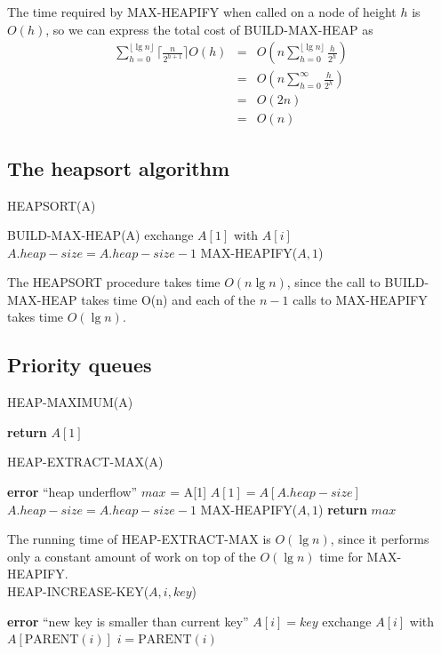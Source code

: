\documentclass[12pt]{article}
\begin{document}
The time required by MAX-HEAPIFY when called on a node of height $h$ is $O(h)$, so we can express the total cost of BUILD-MAX-HEAP as
\begin{eqnarray*}
  \sum_{h=0}^{\lfloor \lg n \rfloor} \lceil \frac {n}{2^{h+1}} \rceil O(h)
  &=& O(n \sum_{h=0}^{\lfloor \lg n \rfloor} \frac {h}{2^h}) \\
  &=& O(n \sum_{h=0}^{\infty} \frac {h}{2^h}) \\
  &=& O(2n) \\
  &=& O(n)
\end{eqnarray*}

\subsection{The heapsort algorithm}

HEAPSORT(A)
\begin{algorithmic}[1]
\State BUILD-MAX-HEAP(A)
	\State exchange $A[1]$ with $A[i]$
        \State $A.heap-size = A.heap-size - 1$
	\State MAX-HEAPIFY($A, 1$)
\EndFor
\end{algorithmic}

The HEAPSORT procedure takes time $O(n \lg n)$, since the call to BUILD-MAX-HEAP takes time O(n) and each of the $n-1$ calls to MAX-HEAPIFY takes time $O(\lg n)$.

\subsection{Priority queues}

HEAP-MAXIMUM(A)
\begin{algorithmic}[1]
\State \textbf {return} $A[1]$
\end{algorithmic}

HEAP-EXTRACT-MAX(A)
\begin{algorithmic}[1]
	\State \textbf {error} ``heap underflow''
\EndIf
\State $max$ = A[1]
\State $A[1] = A[A.heap-size]$
\State $A.heap-size = A.heap-size - 1$
\State MAX-HEAPIFY($A,1$)
\State \textbf {return} $max$
\end{algorithmic}

The running time of HEAP-EXTRACT-MAX is $O(\lg n)$, since it performs only a constant amount of work on top of the $O(\lg n)$ time for MAX-HEAPIFY. \\

HEAP-INCREASE-KEY($A, i, key$)
\begin{algorithmic}[1]
	\State \textbf {error} ``new key is smaller than current key''
\EndIf
\State $A[i] = key$
	\State exchange $A[i]$ with $A[\text {PARENT}(i)]$
        \State $i = \text {PARENT}(i)$
\EndWhile
\end{algorithmic}
\end{document}
